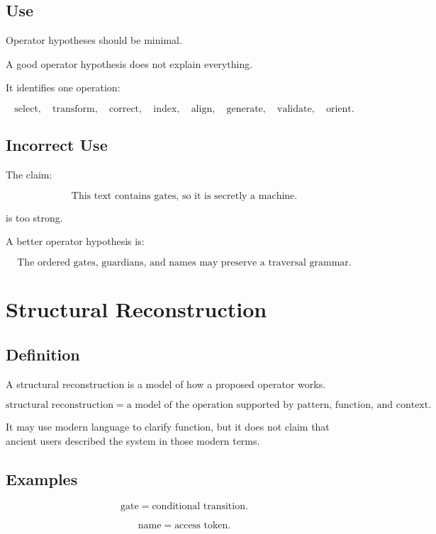 \documentclass[11pt]{book}
\begin{document}
\subsection{Use}

Operator hypotheses should be minimal.

A good operator hypothesis does not explain everything.

It identifies one operation:

\[
\text{select},
\quad
\text{transform},
\quad
\text{correct},
\quad
\text{index},
\quad
\text{align},
\quad
\text{generate},
\quad
\text{validate},
\quad
\text{orient}.
\]

\subsection{Incorrect Use}

The claim:

\[
\text{This text contains gates, so it is secretly a machine.}
\]

is too strong.

A better operator hypothesis is:

\[
\text{The ordered gates, guardians, and names may preserve a traversal grammar.}
\]

\section{Structural Reconstruction}

\subsection{Definition}

A structural reconstruction is a model of how a proposed operator works.

\[
\text{structural reconstruction} = \text{a model of the operation supported by pattern, function, and context}.
\]

It may use modern language to clarify function, but it does not claim that ancient users described the system in those modern terms.

\subsection{Examples}

\[
\text{gate} = \text{conditional transition}.
\]

\[
\text{name} = \text{access token}.
\]
\end{document}
